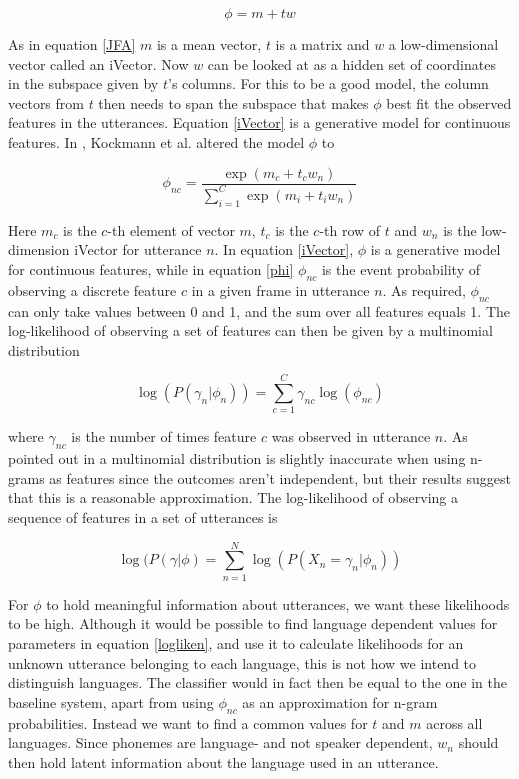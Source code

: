 \begin{equation}\label{iVector}
\phi=m+tw
\end{equation}

As in equation \ref{JFA} $m$ is a mean vector, $t$ is a matrix and $w$ a low-dimensional vector called an iVector. Now $w$ can be looked at as a hidden set of coordinates in the subspace given by $t$'s columns. For this to be a good model, the column vectors from $t$ then needs to span the subspace that makes $\phi$ best fit the observed features in the utterances. Equation \ref{iVector} is a generative model for continuous features. In \cite{sviVector}, Kockmann et al. altered the model $\phi$ to

\begin{equation}\label{phi}
\phi_{nc}=\frac{\exp(m_c+t_cw_n)}{\sum_{i=1}^{C}\exp(m_i+t_iw_n)}
\end{equation}

Here $m_c$ is the $c$-th element of vector $m$, $t_c$ is the $c$-th row of $t$ and $w_n$ is the low-dimension iVector for utterance $n$. In equation \ref{iVector}, $\phi$ is a generative model for continuous features, while in equation \ref{phi} $\phi_{nc}$ is the event probability of observing a discrete feature $c$ in a given frame in utterance $n$. As required, $\phi_{nc}$ can only take values between 0 and 1, and the sum over all features equals 1. The log-likelihood of observing a set of features can then be given by a multinomial distribution

\begin{equation}\label{logliken}
\log(P(\gamma_n |\phi_n)) = \sum_{c=1}^{C}\gamma_{nc}\log(\phi_{nc})
\end{equation}

where $\gamma_{nc}$ is the number of times feature $c$ was observed in utterance $n$. As pointed out in \cite{liiVector} a multinomial distribution is slightly inaccurate when using n-grams as features since the outcomes aren't independent, but their results suggest that this is a reasonable approximation. The log-likelihood of observing a sequence of features in a set of utterances is

\begin{equation}\label{loglike}
\log(P(\gamma |\phi) = \sum_{n=1}^{N}\log(P(X_n=\gamma_n |\phi_n))
\end{equation}

For $\phi$ to hold meaningful information about utterances, we want these likelihoods to be high. Although it would be possible to find language dependent values for parameters in equation \ref{logliken}, and use it to calculate likelihoods for an unknown utterance belonging to each language, this is not how we intend to distinguish languages. The classifier would in fact then be equal to the one in the baseline system, apart from using $\phi_{nc}$ as an approximation for n-gram probabilities. Instead we want to find a common values for $t$ and $m$ across all languages. Since phonemes are language- and not speaker dependent, $w_n$ should then hold latent information about the language used in an utterance. 

